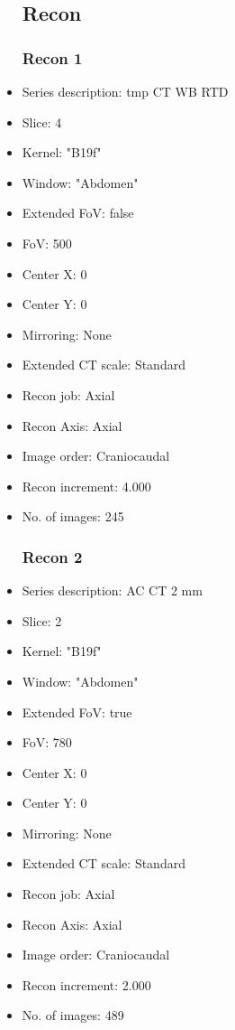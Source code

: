 \documentclass[12pt]{article}
\begin{document}
\begin{itemize}
\subsection{Recon}

\subsubsection{Recon 1}
\item Series description: tmp CT WB RTD
\item Slice: 4
\item Kernel: "B19f"
\item Window: "Abdomen"
\item Extended FoV: false
\item FoV: 500
\item Center X: 0
\item Center Y: 0
\item Mirroring: None
\item Extended CT scale: Standard
\item Recon job: Axial
\item Recon Axis: Axial
\item Image order: Craniocaudal
\item Recon increment: 4.000
\item No. of images: 245
\subsubsection{Recon 2}
\item Series description: AC CT 2 mm
\item Slice: 2
\item Kernel: "B19f"
\item Window: "Abdomen"
\item Extended FoV: true
\item FoV: 780
\item Center X: 0
\item Center Y: 0
\item Mirroring: None
\item Extended CT scale: Standard
\item Recon job: Axial
\item Recon Axis: Axial
\item Image order: Craniocaudal
\item Recon increment: 2.000
\item No. of images: 489

\end{itemize}
\end{document}
